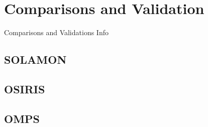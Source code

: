 \section{Comparisons and Validation}

Comparisons and Validations Info

\subsection{SOLAMON}
\subsection{OSIRIS}
\subsection{OMPS} 